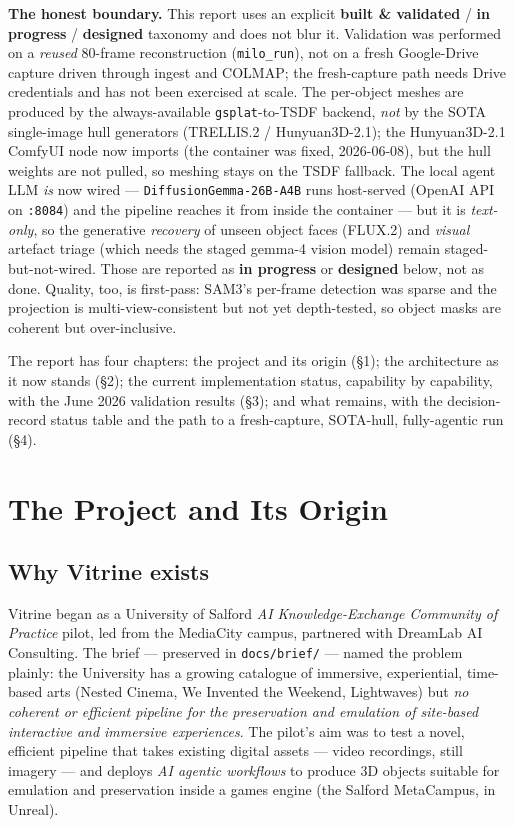 \documentclass[a4paper,11pt]{report}
\newcommand{\chip}[2]{\textcolor{#1}{\textbf{#2}}}
\newcommand{\code}[1]{\texttt{#1}}
\newcommand{\validated}{\chip{SuccessGreen}{built \& validated}}
\newcommand{\wip}{\chip{WarningAmber}{in progress}}
\newcommand{\designed}{\chip{MidGrey}{designed}}
\begin{document}
\textbf{The honest boundary.} This report uses an explicit \validated{} / \wip{} / \designed{} taxonomy
and does not blur it. Validation was performed on a \emph{reused} 80-frame reconstruction
(\code{milo\_run}), not on a fresh Google-Drive capture driven through ingest and COLMAP; the
fresh-capture path needs Drive credentials and has not been exercised at scale. The per-object meshes are
produced by the always-available \code{gsplat}-to-TSDF backend, \emph{not} by the SOTA single-image hull
generators (TRELLIS.2 / Hunyuan3D-2.1); the Hunyuan3D-2.1 ComfyUI node now imports (the container was
fixed, 2026-06-08), but the hull weights are not pulled, so meshing stays on the TSDF fallback. The local
agent LLM \emph{is} now wired --- \code{DiffusionGemma-26B-A4B} runs host-served (OpenAI API on \code{:8084})
and the pipeline reaches it from inside the container --- but it is \emph{text-only}, so the generative
\emph{recovery} of unseen object faces (FLUX.2) and \emph{visual} artefact triage (which needs the staged
gemma-4 vision model) remain staged-but-not-wired. Those are reported as \wip{} or \designed{} below, not as
done. Quality, too,
is first-pass: SAM3's per-frame detection was sparse and the projection is multi-view-consistent but not
yet depth-tested, so object masks are coherent but over-inclusive.

The report has four chapters: the project and its origin (\S1); the architecture as it now stands (\S2);
the current implementation status, capability by capability, with the June 2026 validation results (\S3);
and what remains, with the decision-record status table and the path to a fresh-capture, SOTA-hull,
fully-agentic run (\S4).

\tableofcontents

\cleardoublepage
{}

\chapter{The Project and Its Origin}

\section{Why Vitrine exists}
Vitrine began as a University of Salford \emph{AI Knowledge-Exchange Community of Practice} pilot, led from
the MediaCity campus, partnered with DreamLab AI Consulting. The brief — preserved in \code{docs/brief/} —
named the problem plainly: the University has a growing catalogue of immersive, experiential, time-based
arts (Nested Cinema, We Invented the Weekend, Lightwaves) but \emph{no coherent or efficient pipeline for
the preservation and emulation of site-based interactive and immersive experiences}. The pilot's aim was
to test a novel, efficient pipeline that takes existing digital assets — video recordings, still imagery —
and deploys \emph{AI agentic workflows} to produce 3D objects suitable for emulation and preservation
inside a games engine (the Salford MetaCampus, in Unreal).
\end{document}
